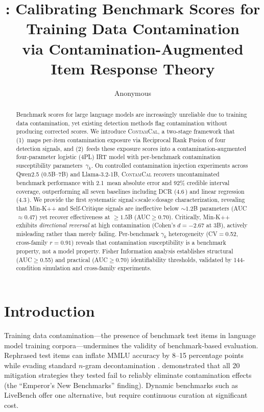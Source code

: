 \documentclass[11pt,a4paper]{article}
\title{\contcal{}: Calibrating Benchmark Scores for Training Data Contamination\\via Contamination-Augmented Item Response Theory}
\author{Anonymous}
\newcommand{\contcal}{\textsc{ContamCal}}
\newcommand{\pp}{\,\text{pp}}
\begin{document}
\maketitle

\begin{abstract}
Benchmark scores for large language models are increasingly unreliable due to training data contamination, yet existing detection methods flag contamination without producing corrected scores.
We introduce \contcal{}, a two-stage framework that (1)~maps per-item contamination exposure via Reciprocal Rank Fusion of four detection signals, and (2)~feeds these exposure scores into a contamination-augmented four-parameter logistic (4PL) IRT model with per-benchmark contamination susceptibility parameters~$\gamma_k$.
On controlled contamination injection experiments across Qwen2.5 (0.5B--7B) and Llama-3.2-1B, \contcal{} recovers uncontaminated benchmark performance with 2.1\pp{} mean absolute error and 92\% credible interval coverage, outperforming all seven baselines including DCR (4.6\pp{}) and linear regression (4.3\pp{}).
We provide the first systematic signal$\times$scale$\times$dosage characterization, revealing that Min-K++ and Self-Critique signals are ineffective below ${\sim}1.2$B parameters (AUC$\approx$0.47) yet recover effectiveness at ${\geq}1.5$B (AUC$\geq$0.70).
Critically, Min-K++ exhibits \emph{directional reversal} at high contamination (Cohen's $d=-2.67$ at 3B), actively misleading rather than merely failing.
Per-benchmark $\gamma_k$ heterogeneity (CV$=$0.52, cross-family $r=0.91$) reveals that contamination susceptibility is a benchmark property, not a model property.
Fisher Information analysis establishes structural (AUC$\geq$0.55) and practical (AUC$\geq$0.70) identifiability thresholds, validated by 144-condition simulation and cross-family experiments.
\end{abstract}

\section{Introduction}

Training data contamination---the presence of benchmark test items in language model training corpora---undermines the validity of benchmark-based evaluation.
Rephrased test items can inflate MMLU accuracy by 8--15 percentage points while evading standard $n$-gram decontamination \citep{balloccu2024leak,dekoninck2024evading}.
\citet{oren2024proving} demonstrated that all 20 mitigation strategies they tested fail to reliably eliminate contamination effects (the ``Emperor's New Benchmarks'' finding).
Dynamic benchmarks such as LiveBench \citep{white2024livebench} offer one alternative, but require continuous curation at significant cost.
\end{document}
